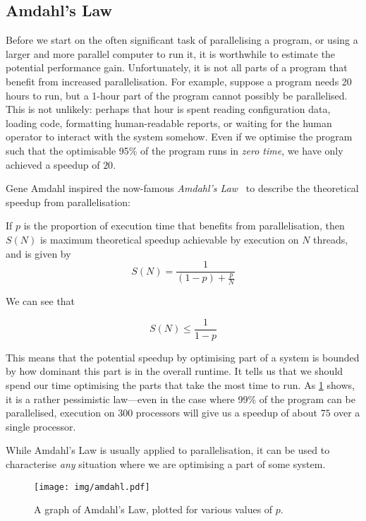 \subsection{Amdahl's Law}

Before we start on the often significant task of parallelising a
program, or using a larger and more parallel computer to run it, it is
worthwhile to estimate the potential performance gain.  Unfortunately,
it is not all parts of a program that benefit from increased
parallelisation.  For example, suppose a program needs 20 hours to
run, but a 1-hour part of the program cannot possibly be parallelised.
This is not unlikely: perhaps that hour is spent reading configuration
data, loading code, formatting human-readable reports, or waiting for
the human operator to interact with the system somehow.  Even if we
optimise the program such that the optimisable 95\% of the program
runs in \emph{zero time}, we have only achieved a speedup of $20$.

Gene Amdahl inspired the now-famous \emph{Amdahl's
  Law}~\cite{10.1145/1465482.1465560} to describe the theoretical
speedup from parallelisation:

\begin{definition}\label{amdahl}

  If $p$ is the proportion of execution time that benefits from
  parallelisation, then $S(N)$ is maximum theoretical speedup
  achievable by execution on $N$ threads, and is given by
  \[
    S(N) = \frac{1}{(1-p)+\frac{p}{N}}
  \]
\end{definition}

We can see that

\[
  S(N) \leq \frac{1}{1-p}
\]

This means that the potential speedup by optimising part of a system
is bounded by how dominant this part is in the overall runtime.  It
tells us that we should spend our time optimising the parts that take
the most time to run.  As \cref{fig:amdahl} shows, it is a rather
pessimistic law---even in the case where 99\% of the program can be
parallelised, execution on 300 processors will give us a speedup of
about $75$ over a single processor.

While Amdahl's Law is usually applied to parallelisation, it can be
used to characterise \emph{any} situation where we are optimising a
part of some system.

\begin{figure}
  \centering
  \texttt{[image: img/amdahl.pdf]}
  \caption{A graph of Amdahl's Law, plotted for various values of $p$.}
  \label{fig:amdahl}
\end{figure}


